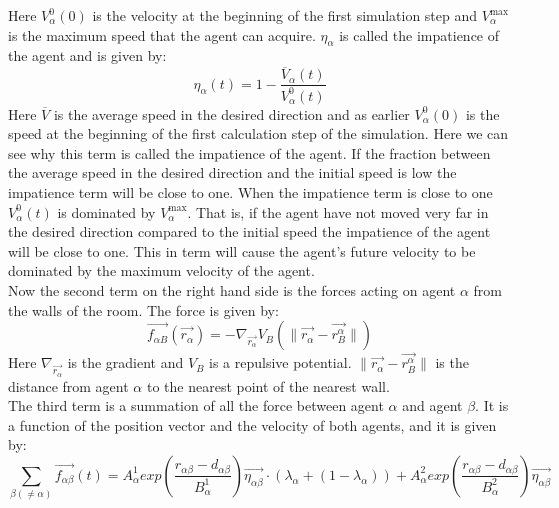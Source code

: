 \documentclass[12pt,a4paper]{report} %
\begin{document}
Here $V_{\alpha}^{0} \left( 0 \right)$ is the velocity at the beginning of the first simulation step and $V_{\alpha}^{\text{max}}$ is the maximum speed that the agent can acquire. $\eta_{\alpha}$ is called the impatience of the agent and is given by:
\begin{equation}
	\eta_{\alpha} \left( t \right) = 1 - \frac{\overline{V}_{\alpha} \left( t \right)}{V_{\alpha}^{0} \left( t \right)}
\end{equation}
Here $\overline{V}$ is the average speed in the desired direction and as earlier $V_{\alpha}^{0} \left( 0 \right)$ is the speed at the beginning of the first calculation step of the simulation. Here we can see why this term is called the impatience of the agent. If the fraction between the average speed in the desired direction and the initial speed is low the impatience term will be close to one. When the impatience term is close to one $V_{\alpha}^{0} \left( t \right)$ is dominated by $V_{\alpha}^{\text{max}}$. That is, if the agent have not moved very far in the desired direction compared to the initial speed the impatience of the agent will be close to one. This in term will cause the agent's future velocity to be dominated by the maximum velocity of the agent.\\
Now the second term on the right hand side is the forces acting on agent $\alpha$ from the walls of the room. The force is given by:
\begin{equation}
\vec{f_{\alpha B}} \left( \vec{r_{\alpha}} \right) = - \nabla_{\vec{r_{\alpha}}} V_{B} \left( \| \vec{r_{\alpha}} - \vec{r_{B}^{\alpha}} \| \right) 
\end{equation}
Here $\nabla_{\vec{r_{\alpha}}}$ is the gradient and $V_B$ is a repulsive potential. $ \| \vec{r_{\alpha}} - \vec{r_{B}^{\alpha}} \|$ is the distance from agent $\alpha$ to the nearest point of the nearest wall.\\
The third term is a summation of all the force between agent $\alpha$ and agent $\beta$. It is a function of the position vector and the velocity of both agents, and it is given by:
\begin{equation}\label{agentinteraction}
\sum_{\beta \left( \neq \alpha \right)} \vec{f_{\alpha \beta }}\left( t \right) = 
A_{\alpha}^{1} exp \left( \frac{ r_{\alpha \beta} - d_{\alpha \beta }}{B_{\alpha}^1} \right)
\vec{\eta_{\alpha \beta}} \cdot 
\left( \lambda_{\alpha} + \left( 1 - \lambda_{\alpha} \right)  \right)+ 
A_{\alpha}^{2} exp\left(\frac{r_{\alpha \beta} - d_{\alpha \beta}}{B_{\alpha}^{2}} \right)\vec{\eta_{\alpha \beta}}
\end{equation}
\end{document}
